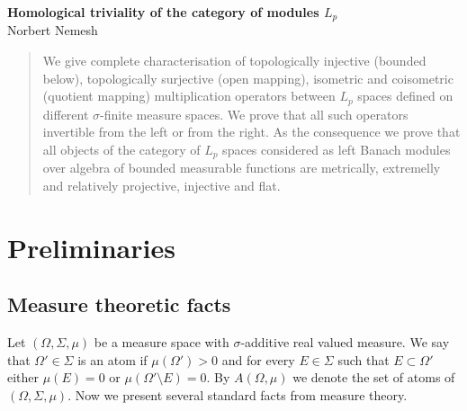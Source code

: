 \documentclass[12pt]{article}
\begin{document}
\begin{center}

    \Large \textbf{Homological triviality of the category of modules
        $L_p$}\\[0.5cm]
    \small {Norbert Nemesh}\\[0.5cm]

\end{center}
\thispagestyle{empty}

\begin{abstract}
    We give complete characterisation of topologically injective (bounded
    below), topologically surjective (open mapping), isometric and coisometric
    (quotient mapping) multiplication operators between $L_p$ spaces defined on
    different $\sigma$-finite measure spaces. We prove that all such operators
    invertible from the left or from the right. As the consequence we prove that
    all objects of the category of $L_p$ spaces considered as left Banach
    modules over algebra of bounded measurable functions are metrically,
    extremelly and relatively projective, injective and flat.
\end{abstract}


\section{Preliminaries}


\subsection{Measure theoretic facts}

Let $(\Omega,\Sigma,\mu)$ be a measure space with $\sigma$-additive real valued
measure. We say that $\Omega'\in\Sigma$ is an atom if $\mu(\Omega')>0$ and for
every $E\in\Sigma$ such that $E\subset\Omega'$ either $\mu(E)=0$ or
$\mu(\Omega'\setminus E)=0$. By $A(\Omega,\mu)$ we denote the set of atoms of
$(\Omega,\Sigma,\mu)$. Now we present several standard facts from measure
theory.
\end{document}
